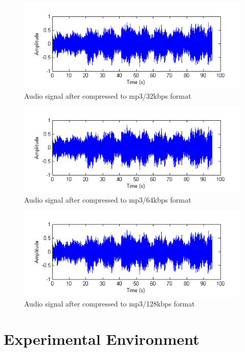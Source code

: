\documentclass[12pt,a4paper]{report}
\begin{document}
\begin{figure}[h!]
\centering
\includegraphics[scale=0.8]{image/mp332.png}
\caption{Audio signal after compressed to mp3/32kbps format}
\label{fig:mp332}
\end{figure}

\newpage

\begin{figure}[h!]
\centering
\includegraphics[scale=0.8]{image/mp364.png}
\caption{Audio signal after compressed to mp3/64kbps format}
\label{fig:mp364}
\end{figure}

\begin{figure}[h!]
\centering
\includegraphics[scale=0.8]{image/mp3128.png}
\caption{Audio signal after compressed to mp3/128kbps format}
\label{fig:mp3128}
\end{figure}

\section{Experimental Environment}
\end{document}
